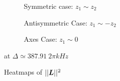 \begin{figure}
     \centering
     \begin{subfigure}[b]{0.6\textwidth}
         \centering
         
         \caption{
            Symmetric case: $z_1 \sim z_2$
         }
         \label{fig:2p:hm:sym}
     \end{subfigure}
     \begin{subfigure}[b]{0.6\textwidth}
         \centering
         
         \caption{
            Antisymmetric Case: $z_1 \sim -z_2$
        }
         \label{fig:2p:hm:asym}
     \end{subfigure}
    \begin{subfigure}[b]{0.6\textwidth}
         \centering
         
         \caption{
            Axes Case: $z_1 \sim 0$
        }
         \label{fig:2p:hm:axis}
     \end{subfigure}
     \caption{Heatmaps of $||\bm{L}||^2$ }
            at $\Delta \simeq 387.91~2\pi\unit{kHz}$
     \label{fig:2p:hm}
\end{figure}


